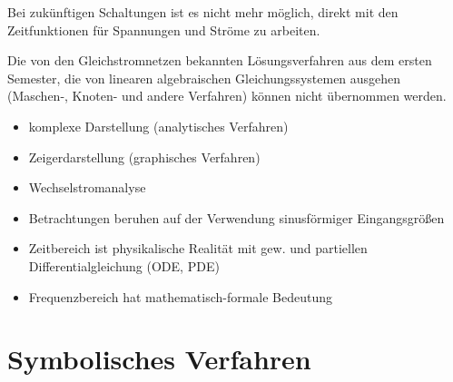 \documentclass[
  ngerman,
  letterpaper,
]{scrbook}
\begin{document}
\begin{tcolorbox}[enhanced jigsaw, titlerule=0mm, rightrule=.15mm, toprule=.15mm, colback=white, toptitle=1mm, bottomrule=.15mm, coltitle=black, leftrule=.75mm, arc=.35mm, colbacktitle=quarto-callout-note-color!10!white, opacityback=0, bottomtitle=1mm, colframe=quarto-callout-note-color-frame, opacitybacktitle=0.6, breakable, title=\textcolor{quarto-callout-note-color}{\faInfo}\hspace{0.5em}{Problemstellung}, left=2mm]

Bei zukünftigen Schaltungen ist es nicht mehr möglich, direkt mit den
Zeitfunktionen für Spannungen und Ströme zu arbeiten.

Die von den Gleichstromnetzen bekannten Lösungsverfahren aus dem ersten
Semester, die von linearen algebraischen Gleichungssystemen ausgehen
(Maschen-, Knoten- und andere Verfahren) können nicht übernommen werden.

\end{tcolorbox}

\begin{tcolorbox}[enhanced jigsaw, titlerule=0mm, rightrule=.15mm, toprule=.15mm, colback=white, toptitle=1mm, bottomrule=.15mm, coltitle=black, leftrule=.75mm, arc=.35mm, colbacktitle=quarto-callout-note-color!10!white, opacityback=0, bottomtitle=1mm, colframe=quarto-callout-note-color-frame, opacitybacktitle=0.6, breakable, title=\textcolor{quarto-callout-note-color}{\faInfo}\hspace{0.5em}{Symbolische Verfahren/Methoden}, left=2mm]

\begin{itemize}
\item
  komplexe Darstellung (analytisches Verfahren)
\item
  Zeigerdarstellung (graphisches Verfahren)
\item
  Wechselstromanalyse
\item
  Betrachtungen beruhen auf der Verwendung sinusförmiger Eingangsgrößen
\item
  Zeitbereich ist physikalische Realität mit gew. und partiellen
  Differentialgleichung (ODE, PDE)
\item
  Frequenzbereich hat mathematisch-formale Bedeutung
\end{itemize}

\end{tcolorbox}

\section{Symbolisches Verfahren}\label{symbolisches-verfahren}
\end{document}

